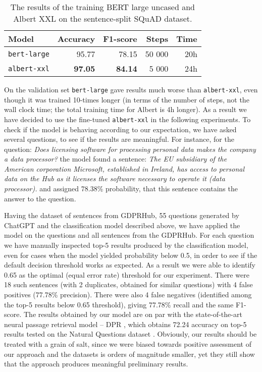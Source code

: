 \begin{table}[htbp]
    \centering\begin{tabular}{l r r r r}
        \hline
        \textbf{Model} & \textbf{Accuracy} & \textbf{F1-score} & \textbf{Steps} & \textbf{Time} \\
        \hline
        \texttt{bert-large} & 95.77 & 78.15 & 50 000 & 20h \\
        \hline
        \texttt{albert-xxl} & \textbf{97.05} & \textbf{84.14} & 5 000 & 24h \\
        \hline
    \end{tabular}
    \caption{The results of the training BERT large uncased and Albert XXL on the sentence-split SQuAD dataset.}
    \label{tab:bert-albert}
\end{table}

On the validation set \texttt{bert-large} gave results much worse than \texttt{albert-xxl}, even though it was trained 10-times longer 
(in terms of the number of steps, not the wall clock time; the total training time for Albert is 4h longer). 
As a result we have decided to use the fine-tuned \texttt{albert-xxl} 
in the following experiments. To check if the model is behaving according to our expectation, we have asked several questions,
to see if the results are meaningful. For instance, for the question: \textit{Does licensing software for processing personal data 
makes the company a data processor?} the model found a sentence: \textit{The EU subsidiary of the American corporation Microsoft, 
established in Ireland, has access to personal data on the Hub as it licenses the software necessary to operate it (data processor).}
and assigned 78.38\% probability, that this sentence contains the answer to the question.

Having the dataset of sentences from GDPRHub, 55 questions generated by ChatGPT and the classification model described above,
we have applied the model on the questions and all sentences from the GDPRHub. For each question we have manually inspected top-5 results
produced by the classification model, even for cases when the model yielded probability below 0.5, in order to see if the default
decision threshold works as expected. As a result we were able to identify 0.65 as the optimal (equal error rate) threshold for our 
experiment. There were 18 such sentences (with 2 duplicates, obtained for similar questions) with 4 false positives (77.78\% precision).
There were also 4 false negatives (identified among the top-5 results below 0.65 threshold), giving 77.78\% recall and the same F1-score. 
The results obtained by our model are on par with the state-of-the-art neural passage retrieval model -- DPR \cite{karpukhin2020dense},
which obtains 72.24 accuracy on top-5 results tested on the Natural Questions dataset \cite{kwiatkowski2019natural}. Obviously, 
our results should be treated with a grain of salt, since we were biased towards positive assessment of our approach and the 
datasets is orders of magnitude smaller, yet they still show that the approach produces meaningful preliminary results.

